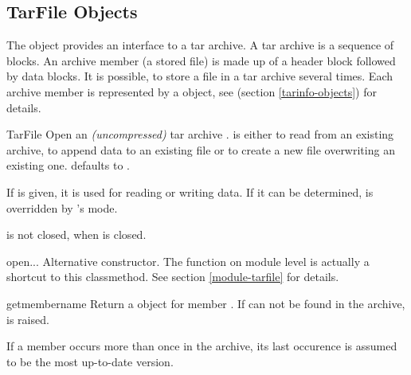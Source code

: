 \begin{seealso}

\end{seealso}


\subsection{TarFile Objects \label{tarfile-objects}}

The  object provides an interface to a tar archive. A tar
archive is a sequence of blocks. An archive member (a stored file) is made up
of a header block followed by data blocks. It is possible, to store a file in a
tar archive several times. Each archive member is represented by a
 object, see  (section
\ref{tarinfo-objects}) for details.

\begin{classdesc}{TarFile}{}
    Open an \emph{(uncompressed)} tar archive .
     is either  to read from an existing archive,
     to append data to an existing file or  to create a new
    file overwriting an existing one.  defaults to .

    If  is given, it is used for reading or writing data.
    If it can be determined,  is overridden by 's mode.
    \begin{notice}
         is not closed, when  is closed.
    \end{notice}
\end{classdesc}

\begin{methoddesc}{open}{...}
    Alternative constructor. The  function on module level is
    actually a shortcut to this classmethod. See section \ref{module-tarfile}
    for details.
\end{methoddesc}

\begin{methoddesc}{getmember}{name}
    Return a  object for member . If  can
    not be found in the archive,  is raised.
    \begin{notice}
        If a member occurs more than once in the archive, its last
        occurence is assumed to be the most up-to-date version.
    \end{notice}
\end{methoddesc}

